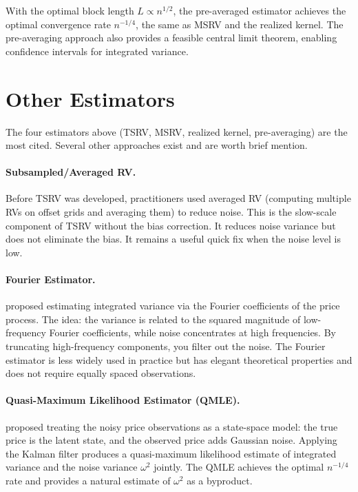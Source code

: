 \begin{keyresult}
With the optimal block length $L \propto n^{1/2}$, the pre-averaged estimator achieves the optimal convergence rate $n^{-1/4}$, the same as MSRV and the realized kernel.
The pre-averaging approach also provides a feasible central limit theorem, enabling confidence intervals for integrated variance.
\end{keyresult}


\section{Other Estimators}
\label{sec:other-estimators}

The four estimators above (TSRV, MSRV, realized kernel, pre-averaging) are the most cited.
Several other approaches exist and are worth brief mention.

\paragraph{Subsampled/Averaged RV.}
Before TSRV was developed, practitioners used averaged RV (computing multiple RVs on offset grids and averaging them) to reduce noise.
This is the slow-scale component of TSRV without the bias correction.
It reduces noise variance but does not eliminate the bias.
It remains a useful quick fix when the noise level is low.

\paragraph{Fourier Estimator.}
\citet{MalliavinMancino2002, MalliavinMancino2009} proposed estimating integrated variance via the Fourier coefficients of the price process.
The idea: the variance is related to the squared magnitude of low-frequency Fourier coefficients, while noise concentrates at high frequencies.
By truncating high-frequency components, you filter out the noise.
The Fourier estimator is less widely used in practice but has elegant theoretical properties and does not require equally spaced observations.

\paragraph{Quasi-Maximum Likelihood Estimator (QMLE).}
\citet{Xiu2010} proposed treating the noisy price observations as a state-space model: the true price is the latent state, and the observed price adds Gaussian noise.
Applying the Kalman filter produces a quasi-maximum likelihood estimate of integrated variance and the noise variance $\omega^2$ jointly.
The QMLE achieves the optimal $n^{-1/4}$ rate and provides a natural estimate of $\omega^2$ as a byproduct.

